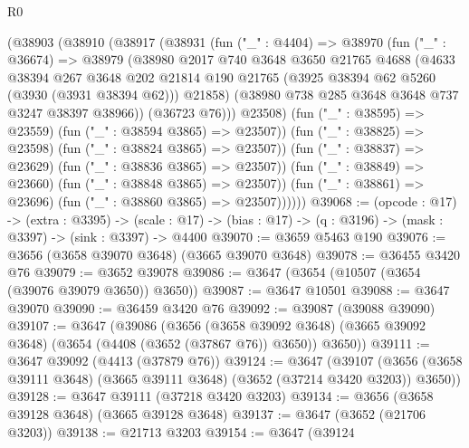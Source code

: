 \begin{lexlean}{R0}
\begin{coremodule}
                (@38903
                  (@38910
                    (@38917
                      (@38931
                        (fun ("_" : @4404) =>
                        @38970
                          (fun ("_" : @36674) =>
                          @38979
                            (@38980
                              @2017
                              @740
                              @3648
                              @3650
                              @21765
                              @4688
                              (@4633
                                @38394
                                @267
                                @3648
                                @202
                                @21814
                                @190
                                @21765
                                (@3925 @38394 @62 @5260 (@3930 (@3931 @38394 @62)))
                                @21858)
                              (@38980 @738 @285 @3648 @3648 @737 @3247 @38397 @38966))
                            (@36723 @76)))
                        @23508)
                      (fun ("_" : @38595) => @23559)
                      (fun ("_" : @38594 @3865) => @23507))
                    (fun ("_" : @38825) => @23598)
                    (fun ("_" : @38824 @3865) => @23507))
                  (fun ("_" : @38837) => @23629)
                  (fun ("_" : @38836 @3865) => @23507))
                (fun ("_" : @38849) => @23660)
                (fun ("_" : @38848 @3865) => @23507))
              (fun ("_" : @38861) => @23696)
              (fun ("_" : @38860 @3865) => @23507))))))
@39068 := (opcode : @17) ->
  (extra : @3395) ->
  (scale : @17) -> (bias : @17) -> (q : @3196) -> (mask : @3397) -> (sink : @3397) -> @4400
@39070 := @3659 @5463 @190
@39076 := @3656 (@3658 @39070 @3648) (@3665 @39070 @3648)
@39078 := @36455 @3420 @76
@39079 := @3652 @39078
@39086 := @3647 (@3654 (@10507 (@3654 (@39076 @39079 @3650)) @3650))
@39087 := @3647 @10501
@39088 := @3647 @39070
@39090 := @36459 @3420 @76
@39092 := @39087 (@39088 @39090)
@39107 := @3647
    (@39086
      (@3656
        (@3658 @39092 @3648)
        (@3665 @39092 @3648)
        (@3654 (@4408 (@3652 (@37867 @76)) @3650))
        @3650))
@39111 := @3647 @39092 (@4413 (@37879 @76))
@39124 := @3647
    (@39107 (@3656 (@3658 @39111 @3648) (@3665 @39111 @3648) (@3652 (@37214 @3420 @3203)) @3650))
@39128 := @3647 @39111 (@37218 @3420 @3203)
@39134 := @3656 (@3658 @39128 @3648) (@3665 @39128 @3648)
@39137 := @3647 (@3652 (@21706 @3203))
@39138 := @21713 @3203
@39154 := @3647
    (@39124

\end{coremodule}
\end{lexlean}

